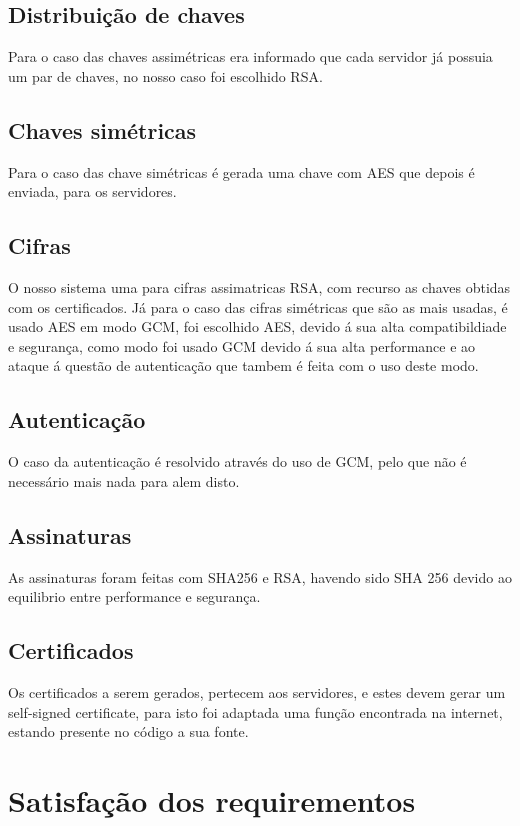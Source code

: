 \documentclass[pdftex,12pt,a4paper]{report}
\begin{document}
\subsection{Distribuição de chaves}
Para o caso das chaves assimétricas era informado que cada servidor já possuia um par de chaves, no nosso caso foi escolhido RSA.

\vskip 0.9cm
\subsection{Chaves simétricas}
Para o caso das chave simétricas é gerada uma chave com AES que depois é enviada, para os servidores.

\vskip 0.9cm
\subsection{Cifras}
O nosso sistema uma para cifras assimatricas RSA, com recurso as chaves obtidas com os certificados.
Já para o caso das cifras simétricas que são as mais usadas, é usado AES em modo GCM, foi escolhido AES, devido á sua alta compatibildiade e segurança, como modo foi usado GCM devido á sua alta performance e ao ataque á questão de autenticação que tambem é feita com o uso deste modo.

\vskip 0.9cm
\subsection{Autenticação}
O caso da autenticação é resolvido através do uso de GCM, pelo que não é necessário mais nada para alem disto.

\vskip 0.9cm
\subsection{Assinaturas}
As assinaturas foram feitas com SHA256 e RSA, havendo sido SHA 256 devido ao equilibrio entre performance e segurança.

\vskip 0.9cm
\subsection{Certificados}
Os certificados a serem gerados, pertecem aos servidores, e estes devem gerar um self-signed certificate, para isto foi adaptada uma função encontrada na internet, estando presente no código a sua fonte.

\newpage
\section{Satisfação dos requirementos}
\vskip 1cm
\end{document}
